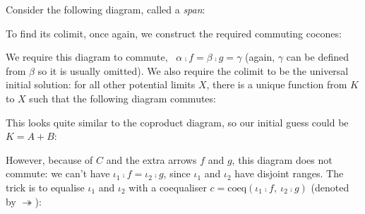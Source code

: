 Consider the following diagram, called a \emph{span}:

\begin{center}
\end{center}

To find its colimit, once again, we construct the required commuting cocones:

\begin{center}
\end{center}

We require this diagram to commute, \ie\ $\alpha \comp f = \beta \comp g =
\gamma$ (again, $\gamma$ can be defined from $\beta$ so it is usually omitted).
We also require the colimit to be the universal initial solution: for all other
potential limits $X$, there is a unique function from $K$ to $X$ such that the
following diagram commutes:

\begin{center}
\end{center}


This looks quite similar to the coproduct diagram, so our initial guess could be
$K = A + B$:

\begin{center}
\end{center}

However, because of $C$ and the extra arrows $f$ and $g$, this diagram does not
commute: we can't have $\iota_1 \comp f = \iota_2 \comp g$, since $\iota_1$ and
$\iota_2$ have disjoint ranges. The trick is to equalise $\iota_1$ and $\iota_2$
with a coequaliser $c = \text{coeq} (\iota_1 \comp f,\ \iota_2 \comp g )$
(denoted by $\twoheadrightarrow$):

